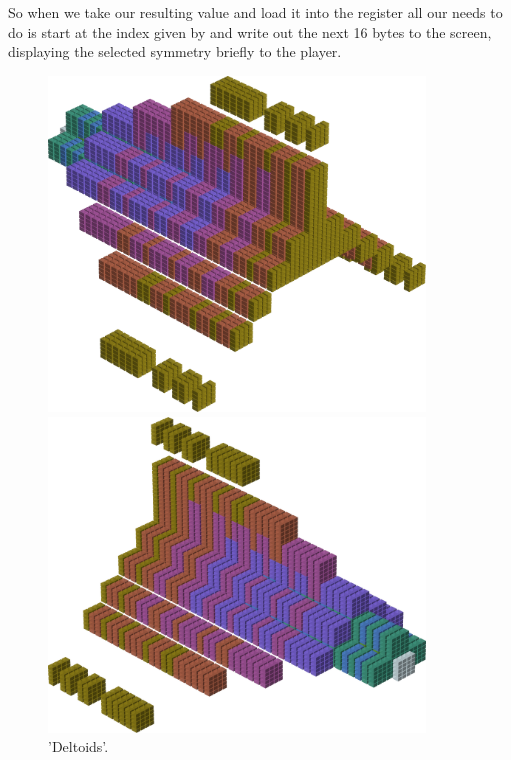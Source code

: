 So when we take our resulting value and load it into the  register all our  needs to do is start at the 
index given by  and write out the next 16 bytes to the screen, displaying the selected symmetry briefly to the player.
\clearpage
\begin{figure}[H]
    \centering
    \begin{adjustbox}{width=10cm,center}
      \includegraphics[width=10cm]{src/colorspace_patterns/pattern3-45.png}%
    \end{adjustbox}
    \begin{adjustbox}{width=10cm}
      \includegraphics[width=10cm]{src/colorspace_patterns/pattern3-225.png}%
    \end{adjustbox}
\caption{'Deltoids'.}
\end{figure}
\clearpage

